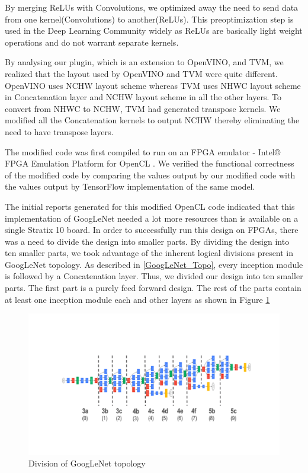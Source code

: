 By merging ReLUs with Convolutions, we optimized away the need to send data from one kernel(Convolutions) to another(ReLUs). This preoptimization step is used in the Deep Learning Community widely as ReLUs are basically light weight operations and do not warrant separate kernels.

By analysing our plugin, which is an extension to OpenVINO, and TVM, we realized that the layout used by OpenVINO and TVM were quite different. OpenVINO uses NCHW layout scheme whereas TVM uses NHWC layout scheme in Concatenation layer and NCHW layout scheme in all the other layers. To convert from NHWC to NCHW, TVM had generated transpose kernels. We modified all the Concatenation kernels to output NCHW thereby eliminating the need to have transpose layers.  

The modified code was first compiled to run on an FPGA emulator - Intel® FPGA Emulation Platform for OpenCL . We verified the functional correctness of the modified code by comparing the values output by our modified code with the values output by TensorFlow implementation of the same model.  

The initial reports generated for this modified OpenCL code indicated that this implementation of GoogLeNet needed a lot more resources than is available on a single Stratix 10 board. In order to successfully run this design on FPGAs, there was a need to divide the design into smaller parts. By dividing the design into ten smaller parts, we took advantage of the inherent logical divisions present in GoogLeNet topology. As  described in \ref{GoogLeNet_Topo}, every inception module is followed by a  Concatenation layer. Thus, we divided our design into ten smaller parts.  The first part is a purely feed forward design. The rest of the parts contain at least one inception module each and other layers as shown in Figure \ref{fig:GoogLeNet_division}


\begin{figure}[h!]
  \includegraphics[width=\textwidth,height=\textheight,keepaspectratio]{img/GoogLeNet_division.png}
  \caption{Division of GoogLeNet topology}
  \label{fig:GoogLeNet_division}
\end{figure}
 
